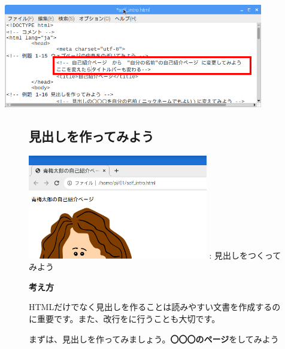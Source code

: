 \documentclass[a4paper,12pt]{jarticle}
\begin{document}
\centering
\includegraphics[width=0.85\textwidth]{textbook-img150.png}


\vfill
\clearpage
\begin{figure}[ht]
  \subsection{\theExercise 見出しを作ってみよう}


  \centering
  \begin{minipage}{\textwidth}
    {\upshape
      \includegraphics[width=0.7\textwidth]{textbook-img153.png}
      \newline
      : 見出しをつくってみよう}
  \end{minipage}


  \bigskip
  \flushleft

  \textbf{考え方}



  \begin{minipage}{\textwidth}
    \flushleft

    HTMLだけでなく見出しを作ることは読みやすい文書を作成するのに重要です。また、改行をに行うことも大切です。

    まずは、見出しを作ってみましょう。\textbf{〇〇〇のページ}をしてみよう


    \bigskip


\end{minipage}
\end{figure}
\end{document}
